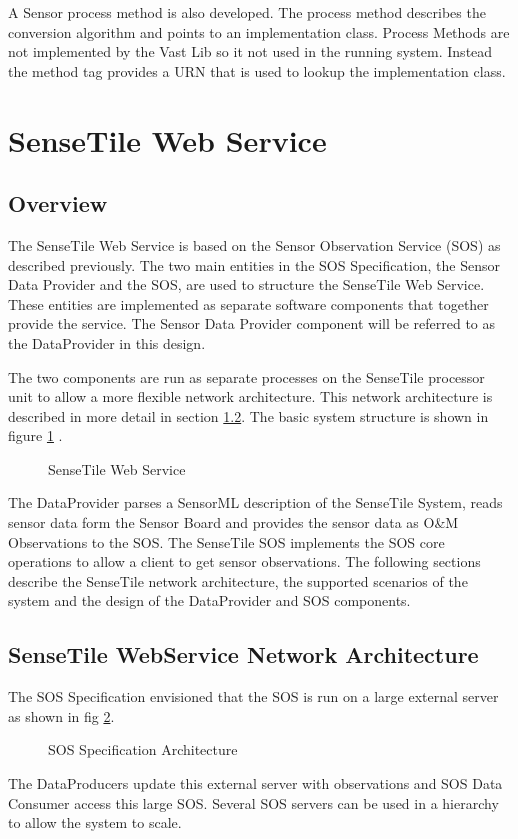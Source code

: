 \documentclass[]{final_report}
\begin{document}
A Sensor process method is also developed. The process method describes the conversion algorithm and points to an implementation class. Process Methods are not implemented by the Vast Lib so it not used in the running system. Instead the method tag provides a URN that is used to lookup the implementation class.

\section{SenseTile Web Service}
\subsection{Overview}

The SenseTile Web Service is based on the Sensor Observation Service (SOS) as described previously. The two main entities in the SOS Specification, the Sensor Data Provider and the SOS,  are used to structure the SenseTile Web Service. These entities are implemented as separate software components that together provide the service. The Sensor Data Provider component will be referred to as the DataProvider in this design.

The two components are run as separate processes on the SenseTile processor unit to allow a more flexible network architecture.  This network architecture is described in more detail in section \ref{subsec:SenseTile WebService Network Architecture}. The basic system structure is shown in figure \ref {fig:Deployment_sensetile} .

\begin{figure}[h]
\centering
{}
\caption{SenseTile Web Service}\label{fig:Deployment_sensetile}
\end{figure}

The DataProvider parses a SensorML description of the SenseTile System, reads sensor data form the Sensor Board and provides the sensor data as O\&M Observations to the SOS. The SenseTile SOS implements the SOS core operations to allow a client to get sensor observations. The following sections describe the SenseTile network architecture, the supported scenarios of the system and the design of the DataProvider and SOS components.

\subsection{SenseTile WebService Network Architecture}
\label{subsec:SenseTile WebService Network Architecture}
The SOS Specification envisioned that the SOS is run on a large external server as shown in fig \ref{fig:Deployment_ext_sos}. 
\begin{figure}[h]
\centering
{}
\caption{SOS Specification Architecture}\label{fig:Deployment_ext_sos}
\end{figure}
\newline
The DataProducers update this external server with observations and SOS Data Consumer access this large SOS. Several SOS servers can be used in a hierarchy to allow the system to scale.
\end{document}
